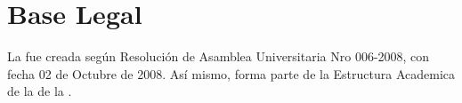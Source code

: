 \section{Base Legal}
La \SchoolFullName fue creada según Resolución de Asamblea Universitaria Nro 006-2008, con fecha 02 de Octubre de 2008.
Así mismo, forma parte de la Estructura Academica de la \FacultadName de la \University.
